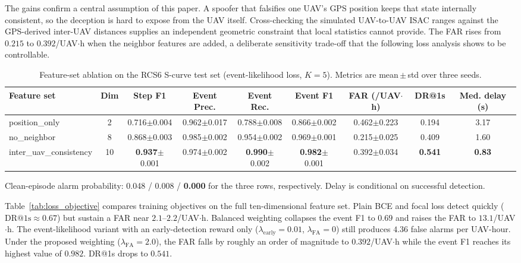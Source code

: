 The gains confirm a central assumption of this paper. A spoofer that
falsifies one UAV's GPS position keeps that state internally consistent,
so the deception is hard to expose from the UAV itself. Cross-checking the
simulated UAV-to-UAV ISAC ranges against the GPS-derived inter-UAV distances
supplies an independent geometric constraint that local statistics cannot
provide. The FAR rises from $0.215$ to $0.392$/UAV$\cdot$h when the neighbor
features are added, a deliberate sensitivity trade-off that the following
loss analysis shows to be controllable.

\begin{table}[htbp]
  \centering
  \caption{Feature-set ablation on the RCS6 S-curve test set
    (event-likelihood loss, $K{=}5$). Metrics are mean\,$\pm$\,std over
    three seeds.}
  \label{tab:feature_ablation}
  \begin{tabular}{lcc ccc ccc}
    \toprule
    Feature set & Dim & Step F1 & Event Prec. & Event Rec. & Event F1
      & FAR (/UAV$\cdot$h) & DR@1s & Med. delay (s) \\
    \midrule
    position\_only          & 2  & 0.716$\pm$0.004 & 0.962$\pm$0.017 & 0.788$\pm$0.008
      & 0.866$\pm$0.002 & 0.462$\pm$0.223 & 0.194 & 3.17 \\
    no\_neighbor            & 8  & 0.868$\pm$0.003 & 0.985$\pm$0.002 & 0.954$\pm$0.002
      & 0.969$\pm$0.001 & 0.215$\pm$0.025 & 0.409 & 1.60 \\
    inter\_uav\_consistency & 10 & \textbf{0.937}$\pm$0.001 & 0.974$\pm$0.002
      & \textbf{0.990}$\pm$0.002 & \textbf{0.982}$\pm$0.001
      & 0.392$\pm$0.034 & \textbf{0.541} & \textbf{0.83} \\
    \bottomrule
  \end{tabular}
  \smallskip
  \footnotesize{Clean-episode alarm probability: 0.048 / 0.008 / \textbf{0.000}
  for the three rows, respectively. Delay is conditional on successful
  detection.}
\end{table}

Table~\ref{tab:loss_objective} compares training objectives on the full
ten-dimensional feature set. Plain BCE and focal loss detect quickly
($\mathrm{DR@1s}{\approx}0.67$) but sustain a FAR near
$2.1$--$2.2$/UAV$\cdot$h. Balanced weighting collapses the event F1 to $0.69$
and raises the FAR to $13.1$/UAV$\cdot$h. The event-likelihood variant with an
early-detection reward only ($\lambda_{\mathrm{early}}{=}0.01$,
$\lambda_{\mathrm{FA}}{=}0$) still produces $4.36$ false alarms per
UAV-hour. Under the proposed weighting ($\lambda_{\mathrm{FA}}{=}2.0$), the
FAR falls by roughly an order of magnitude to $0.392$/UAV$\cdot$h while the
event F1 reaches its highest value of $0.982$. DR@1s drops to $0.541$.


